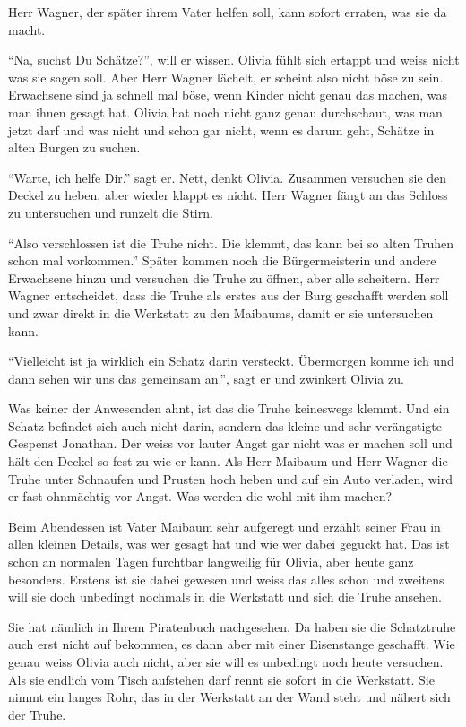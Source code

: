 Herr Wagner, der später ihrem Vater helfen soll, kann sofort erraten, was sie da macht. 

\enquote{Na, suchst Du Schätze?}, will er wissen. Olivia fühlt sich ertappt und weiss nicht was sie sagen soll. Aber Herr Wagner lächelt, er scheint also nicht böse zu sein. Erwachsene sind ja schnell mal böse, wenn Kinder nicht genau das machen, was man ihnen gesagt hat. Olivia hat noch nicht ganz genau durchschaut, was man jetzt darf und was nicht und schon gar nicht, wenn es darum geht, Schätze in alten Burgen zu suchen.

\enquote{Warte, ich helfe Dir.} sagt er. Nett, denkt Olivia. Zusammen versuchen sie den Deckel zu heben, aber wieder klappt es nicht. Herr Wagner fängt an das Schloss zu untersuchen und runzelt die Stirn.

\enquote{Also verschlossen ist die Truhe nicht. Die klemmt, das kann bei so alten Truhen schon mal vorkommen.} Später kommen noch die Bürgermeisterin und andere Erwachsene hinzu und versuchen die Truhe zu öffnen, aber alle scheitern. Herr Wagner entscheidet, dass die Truhe als erstes aus der Burg geschafft werden soll und zwar direkt in die Werkstatt zu den Maibaums, damit er sie untersuchen kann.

\enquote{Vielleicht ist ja wirklich ein Schatz darin versteckt. Übermorgen komme ich und dann sehen wir uns das gemeinsam an.}, sagt er und zwinkert Olivia zu. 

Was keiner der Anwesenden ahnt, ist das die Truhe keineswegs klemmt. Und ein Schatz befindet sich auch nicht darin, sondern das kleine und sehr verängstigte Gespenst Jonathan. Der weiss vor lauter Angst gar nicht was er machen soll und hält den Deckel so fest zu wie er kann. Als Herr Maibaum und Herr Wagner die Truhe unter Schnaufen und Prusten hoch heben und auf ein Auto verladen, wird er fast ohnmächtig vor Angst. Was werden die wohl mit ihm machen?

Beim Abendessen ist Vater Maibaum sehr aufgeregt und erzählt seiner Frau in allen kleinen Details, was wer gesagt hat und wie wer dabei geguckt hat. Das ist schon an normalen Tagen furchtbar langweilig für Olivia, aber heute ganz besonders. Erstens ist sie dabei gewesen und weiss das alles schon und zweitens will sie doch unbedingt nochmals in die Werkstatt und sich die Truhe ansehen. 

Sie hat nämlich in Ihrem Piratenbuch nachgesehen. Da haben sie die Schatztruhe auch erst nicht auf bekommen, es dann aber mit einer Eisenstange geschafft. Wie genau weiss Olivia auch nicht, aber sie will es unbedingt noch heute versuchen. Als sie endlich vom Tisch aufstehen darf rennt sie sofort in die Werkstatt. Sie nimmt ein langes Rohr, das in der Werkstatt an der Wand steht und nähert sich der Truhe.

